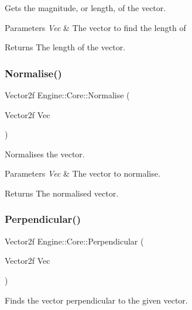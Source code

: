 Gets the magnitude, or length, of the vector. 


\begin{DoxyParams}{Parameters}
{\em Vec} & The vector to find the length of\\
\hline
\end{DoxyParams}
\begin{DoxyReturn}{Returns}
The length of the vector.
\end{DoxyReturn}
\mbox{\label{namespace_engine_1_1_core_a816eef2f0a1a1ae9bfb3b520eeb73677}} 
\subsubsection{\texorpdfstring{Normalise()}{Normalise()}}
{\footnotesize\ttfamily Vector2f Engine\+::\+Core\+::\+Normalise (\begin{DoxyParamCaption}\item[{Vector2f}]{Vec }\end{DoxyParamCaption})}



Normalises the vector. 


\begin{DoxyParams}{Parameters}
{\em Vec} & The vector to normalise.\\
\hline
\end{DoxyParams}
\begin{DoxyReturn}{Returns}
The normalised vector.
\end{DoxyReturn}
\mbox{\label{namespace_engine_1_1_core_a5c9f2a12905370df10a29ffd47e8e919}} 
\subsubsection{\texorpdfstring{Perpendicular()}{Perpendicular()}}
{\footnotesize\ttfamily Vector2f Engine\+::\+Core\+::\+Perpendicular (\begin{DoxyParamCaption}\item[{Vector2f}]{Vec }\end{DoxyParamCaption})}



Finds the vector perpendicular to the given vector. 


